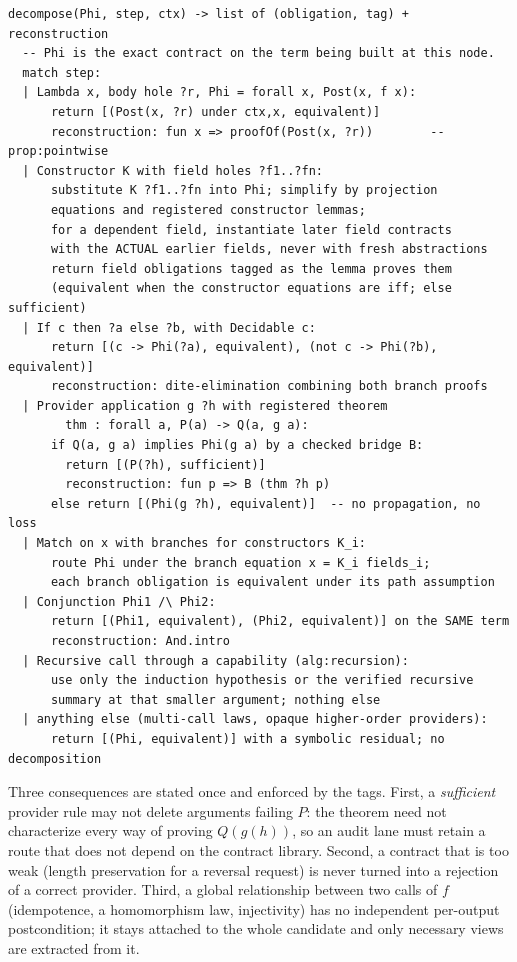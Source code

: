 \begin{lstlisting}
decompose(Phi, step, ctx) -> list of (obligation, tag) + reconstruction
  -- Phi is the exact contract on the term being built at this node.
  match step:
  | Lambda x, body hole ?r, Phi = forall x, Post(x, f x):
      return [(Post(x, ?r) under ctx,x, equivalent)]
      reconstruction: fun x => proofOf(Post(x, ?r))        -- prop:pointwise
  | Constructor K with field holes ?f1..?fn:
      substitute K ?f1..?fn into Phi; simplify by projection
      equations and registered constructor lemmas;
      for a dependent field, instantiate later field contracts
      with the ACTUAL earlier fields, never with fresh abstractions
      return field obligations tagged as the lemma proves them
      (equivalent when the constructor equations are iff; else sufficient)
  | If c then ?a else ?b, with Decidable c:
      return [(c -> Phi(?a), equivalent), (not c -> Phi(?b), equivalent)]
      reconstruction: dite-elimination combining both branch proofs
  | Provider application g ?h with registered theorem
        thm : forall a, P(a) -> Q(a, g a):
      if Q(a, g a) implies Phi(g a) by a checked bridge B:
        return [(P(?h), sufficient)]
        reconstruction: fun p => B (thm ?h p)
      else return [(Phi(g ?h), equivalent)]  -- no propagation, no loss
  | Match on x with branches for constructors K_i:
      route Phi under the branch equation x = K_i fields_i;
      each branch obligation is equivalent under its path assumption
  | Conjunction Phi1 /\ Phi2:
      return [(Phi1, equivalent), (Phi2, equivalent)] on the SAME term
      reconstruction: And.intro
  | Recursive call through a capability (alg:recursion):
      use only the induction hypothesis or the verified recursive
      summary at that smaller argument; nothing else
  | anything else (multi-call laws, opaque higher-order providers):
      return [(Phi, equivalent)] with a symbolic residual; no decomposition
\end{lstlisting}

Three consequences are stated once and enforced by the tags. First, a \emph{sufficient} provider rule may not delete arguments failing $P$: the theorem need not characterize every way of proving $Q(g(h))$, so an audit lane must retain a route that does not depend on the contract library. Second, a contract that is too weak (length preservation for a reversal request) is never turned into a rejection of a correct provider. Third, a global relationship between two calls of $f$ (idempotence, a homomorphism law, injectivity) has no independent per-output postcondition; it stays attached to the whole candidate and only necessary views are extracted from it.

